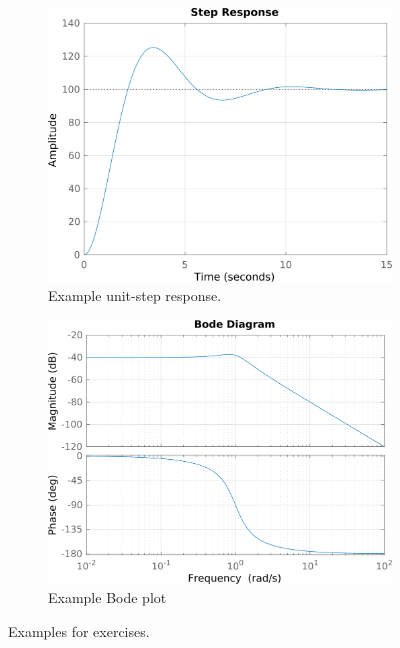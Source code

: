 \documentclass[11pt]{article}
\begin{document}
\begin{figure}
\centering
\begin{subfigure}{.5\textwidth}
  \centering
  \includegraphics[width=\linewidth]{step2.png}
  \caption{Example unit-step response.}
  \label{f:step2}
\end{subfigure}%
\begin{subfigure}{.5\textwidth}
  \centering
  \includegraphics[width=\linewidth]{bode2.png}
  \caption{Example Bode plot}
  \label{f:bode2}
\end{subfigure}
\caption{Examples for exercises.}
\label{f:ex}
\end{figure}


\end{document}
